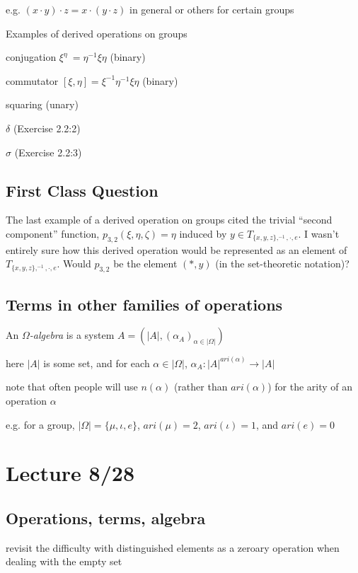 \documentclass[12pt]{article}
\begin{document}
e.g. $(x \cdot y) \cdot z = x \cdot (y \cdot z)$ in general or others for certain groups

\noindent
Examples of derived operations on groups

conjugation $\xi^{\eta}\ = \eta^{-1}\xi\eta$ (binary)

commutator $[\xi, \eta] = \xi^{-1}\eta^{-1}\xi\eta$ (binary)

squaring (unary)

$\delta$ (Exercise 2.2:2)

$\sigma$ (Exercise 2.2:3)

\subsection{First Class Question}

The last example of a derived operation on groups cited the trivial ``second component'' function, $p_{3, 2}(\xi, \eta, \zeta) = \eta$ induced by $y \in T_{\{x, y, z\}, ^{-1}, \cdot, e}$.  I wasn't entirely sure how this derived operation would be represented as an element of $T_{\{x, y, z\}, ^{-1}, \cdot, e}$.  Would $p_{3, 2}$ be the element $(*, y)$ (in the set-theoretic notation)?

\subsection{Terms in other families of operations}

\noindent
An \textit{$\Omega$-algebra} is a system $A = (|A|, (\alpha_A)_{\alpha \in |\Omega|})$

here $|A|$ is some set, and for each $\alpha \in |\Omega|$, $\alpha_A : |A|^{ari(\alpha)} \to |A|$

note that often people will use $n(\alpha)$ (rather than $ari(\alpha)$) for the arity of an operation $\alpha$

e.g. for a group, $|\Omega| = \{\mu, \iota, e\}$, $ari(\mu) = 2$, $ari(\iota) = 1$, and $ari(e) = 0$

\section{Lecture 8/28}

\subsection{Operations, terms, algebra}

revisit the difficulty with distinguished elements as a zeroary operation when dealing with the empty set
\end{document}
